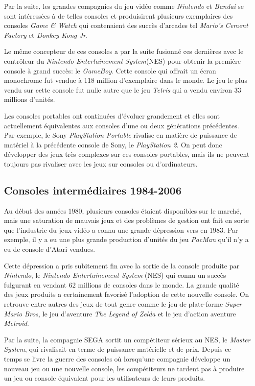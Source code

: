\documentclass[12pt,oneside,letterpaper,francais]{book}
\begin{document}
Par la suite, les grandes compagnies du jeu vidéo comme
\textit{Nintendo} et \textit{Bandai} se sont intéressées à de telles
consoles et produisirent plusieurs exemplaires des consoles
\textit{Game \& Watch} qui contenaient des succès d'arcades tel
\textit{Mario's Cement Factory} et \textit{Donkey Kong Jr}.

Le même concepteur de ces consoles a par la suite fusionné ces
dernières avec le contrôleur du \textit{Nintendo Entertainement
  System}(NES) pour obtenir la première console à grand succès: le
\textit{GameBoy}. Cette console qui offrait un écran monochrome fut
vendue à 118 million d'exemplaire dans le monde. Le jeu le plus vendu
sur cette console fut nulle autre que le jeu \textit{Tetris} qui a
vendu environ 33 millions d'unités.

Les consoles portables ont continuées d'évoluer grandement et elles
sont actuellement équivalentes aux consoles d'une ou deux générations
précédentes. Par exemple, le Sony \textit{PlayStation Portable}
rivalise en matière de puissance de matériel à la précédente console
de Sony, le \textit{PlayStation 2}. On peut donc développer des jeux
très complexes sur ces consoles portables, mais ils ne peuvent toujours
pas rivaliser avec les jeux sur consoles ou d'ordinateurs.

\subsection{Consoles intermédiaires 1984-2006}
Au début des années 1980, plusieurs consoles étaient disponibles sur
le marché, mais une saturation de mauvais jeux et des problèmes de
gestion ont fait en sorte que l'industrie du jeux vidéo a connu une
grande dépression vers en 1983. Par exemple, il y a eu une plus grande
production d'unités du jeu \textit{PacMan} qu'il n'y a eu de console
d'Atari vendues.

Cette dépression a pris subitement fin avec la sortie de la console
produite par \textit{Nintendo}, le \textit{Nintendo Entertainement
  System} (NES) qui connu un succès fulgurant en vendant 62 millions
de consoles dans le monde. La grande qualité des jeux produits a
certainement favorisé l'adoption de cette nouvelle console. On
retrouve entre autres des jeux de tout genre comme le jeu de
plate-forme \textit{Super Mario Bros}, le jeu d'aventure \textit{The
  Legend of Zelda} et le jeu d'action aventure \textit{Metroid}.

Par la suite, la compagnie SEGA sortit un compétiteur sérieux au NES,
le \textit{Master System}, qui rivalisait en terme de puissance
matérielle et de prix. Depuis ce temps se livre la guerre des consoles
où lorsqu'une compagnie développe un nouveau jeu ou une nouvelle
console, les compétiteurs ne tardent pas à produire un jeu ou console
équivalent pour les utilisateurs de leurs produits.
\end{document}
